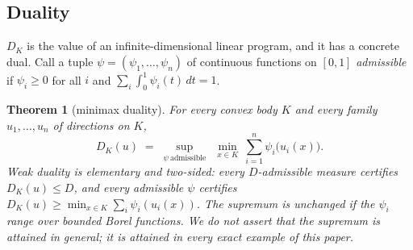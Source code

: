 \documentclass{aims}
\numberwithin{equation}{section}
\theoremstyle{plain}
\newtheorem{theorem}{Theorem}[section]
\theoremstyle{definition}
\theoremstyle{remark}
\begin{document}
\subsection*{Duality}
$D_K$ is the value of an infinite-dimensional linear program, and it has a
concrete dual. Call a tuple $\psi=(\psi_1,\dots,\psi_n)$ of continuous
functions on $[0,1]$ \emph{admissible} if $\psi_i\ge0$ for all $i$ and
$\sum_i\int_0^1\psi_i(t)\,dt=1$.

\begin{theorem}[minimax duality]\label{thm:duality}
For every convex body $K$ and every family $u_1,\dots,u_n$ of directions on
$K$,
\[
D_K(u)\;=\;\sup_{\psi\ \mathrm{admissible}}\ \ \min_{x\in K}\
\sum_{i=1}^n\psi_i\bigl(u_i(x)\bigr).
\]
Weak duality is elementary and two-sided: every $D$-admissible measure
certifies $D_K(u)\le D$, and every admissible $\psi$ certifies
$D_K(u)\ge\min_{x\in K}\sum_i\psi_i(u_i(x))$. The supremum is unchanged if the
$\psi_i$ range over bounded Borel functions. We do \emph{not} assert that the
supremum is attained in general; it is attained in every exact example of
this paper.
\end{theorem}
\end{document}
